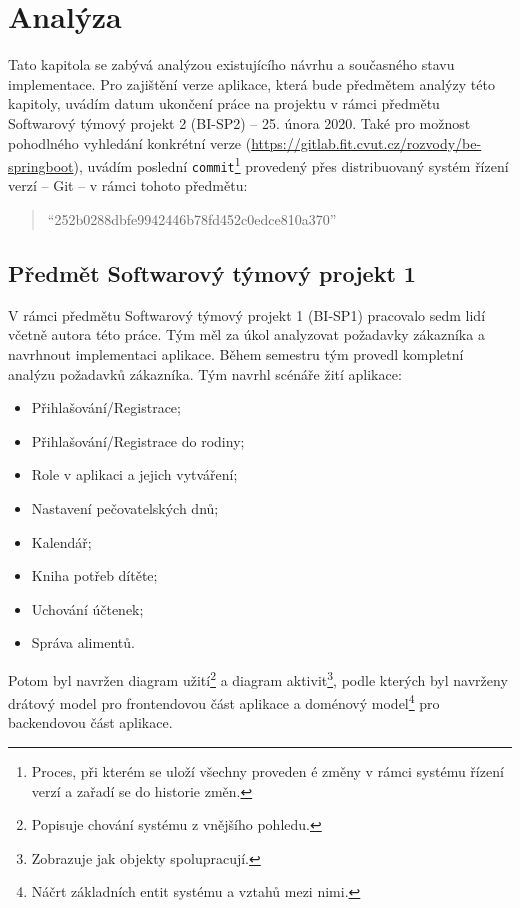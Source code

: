 \chapter{Analýza}\label{chapter:analyza}

Tato kapitola se zabývá analýzou existujícího návrhu a současného stavu implementace. Pro zajištění verze aplikace, která bude předmětem analýzy této kapitoly, uvádím datum ukončení práce na projektu v rámci předmětu Softwarový týmový projekt 2 (BI-SP2) -- 25. února 2020. Také pro možnost pohodlného vyhledání konkrétní verze  (\url{https://gitlab.fit.cvut.cz/rozvody/be-springboot}), uvádím poslední \texttt{commit}\footnote{Proces, při kterém se uloží všechny proveden
é změny v rámci systému řízení verzí a zařadí se do historie změn.} provedený přes distribuovaný systém řízení verzí -- Git -- v rámci tohoto předmětu: 
\begin{quote}
    \enquote{252b0288dbfe9942446b78fd452c0edce810a370}
\end{quote}

\section{Předmět Softwarový týmový projekt 1}\label{analyza:navrh:sp1}
    V rámci předmětu Softwarový týmový projekt 1 (BI-SP1) pracovalo sedm lidí včetně autora této práce. Tým měl za úkol analyzovat požadavky zákazníka a navrhnout implementaci aplikace. Během semestru tým provedl kompletní analýzu požadavků zákazníka. Tým navrhl scénáře žití aplikace:
    \begin{itemize}
	   \item Přihlašování/Registrace;
	   \item Přihlašování/Registrace do rodiny;
	   \item Role v aplikaci a jejich vytváření;
	   \item Nastavení pečovatelských dnů;
	   \item Kalendář;
	   \item Kniha potřeb dítěte;
	   \item Uchování účtenek;
	   \item Správa alimentů.
	\end{itemize}
    Potom byl navržen diagram užití\footnote{Popisuje chování systému z vnějšího pohledu.} a diagram aktivit\footnote{Zobrazuje jak objekty spolupracují.}, podle kterých byl navrženy drátový model pro frontendovou část aplikace a doménový model\footnote{Náčrt základních entit systému a vztahů mezi nimi.} pro backendovou část aplikace. 
    
